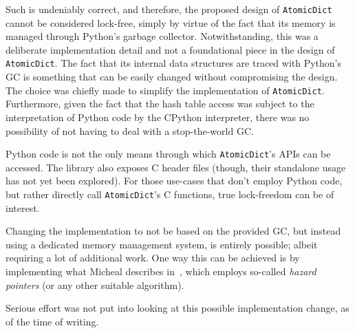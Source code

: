 Such is undeniably correct, and therefore, the proposed design of \texttt{Atomic\-Dict} cannot be considered lock-free, simply by virtue of the fact that its memory is managed through Python's garbage collector.
Notwithstanding, this was a deliberate implementation detail and not a foundational piece in the design of \texttt{AtomicDict}.
The fact that its internal data structures are traced with Python's GC is something that can be easily changed without compromising the design.
The choice was chiefly made to simplify the implementation of \texttt{AtomicDict}.
Furthermore, given the fact that the hash table access was subject to the interpretation of Python code by the CPython interpreter, there was no possibility of not having to deal with a stop-the-world GC\@.

Python code is not the only means through which \texttt{AtomicDict}'s APIs can be accessed.
The library also exposes C header files (though, their standalone usage has not yet been explored).
For those use-cases that don't employ Python code, but rather directly call \texttt{AtomicDict}'s C functions, true lock-freedom can be of interest.

Changing the implementation to not be based on the provided GC, but instead using a dedicated memory management system, is entirely possible; albeit requiring a lot of additional work.
One way this can be achieved is by implementing what Micheal describes in~\cite{micheal-safe-reclamation}, which employs so-called \emph{hazard pointers} (or any other suitable algorithm).

Serious effort was not put into looking at this possible implementation change, as of the time of writing.
